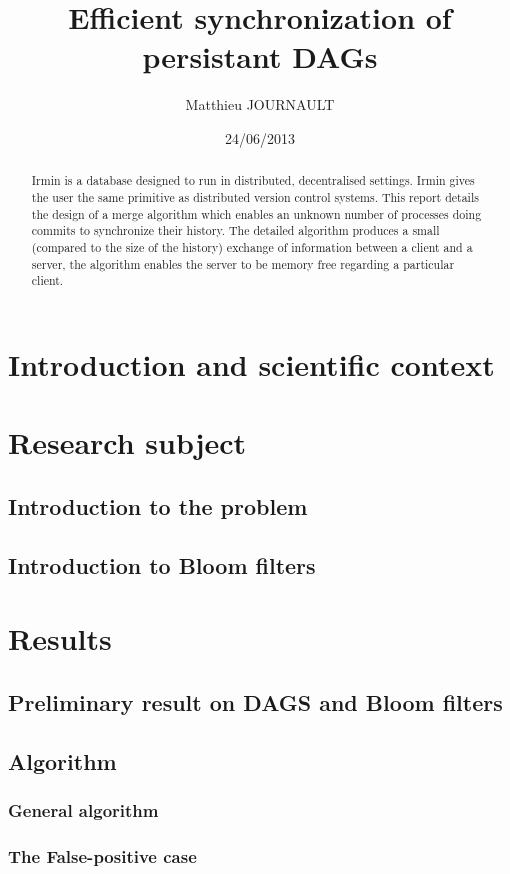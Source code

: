 \documentclass[a4paper,10pt]{report}
\title{Efficient synchronization of persistant DAGs}
\author{Matthieu JOURNAULT}
\date{24/06/2013}
\theoremstyle{definition}
\theoremstyle{definition}
\begin{document}
\maketitle
\begin{abstract}
Irmin is a database designed to run in distributed, decentralised settings. Irmin gives the user the same primitive as distributed version control systems. This report details the design of a merge algorithm which enables an unknown number of processes doing commits to synchronize their history. The detailed algorithm produces a small (compared to the size of the history) exchange of information between a client and a server, the algorithm enables the server to be memory free regarding a particular client.
\end{abstract}
\tableofcontents
% 
\chapter{Introduction and scientific context}
\chapter{Research subject}
\section{Introduction to the problem}

\section{Introduction to Bloom filters}

\chapter{Results}
\section{Preliminary result on DAGS and Bloom filters}
\label{sec:prelim}

\section{Algorithm}
\subsection{General algorithm}

\subsection{The False-positive case}
\label{sec:fp}

\end{document}

